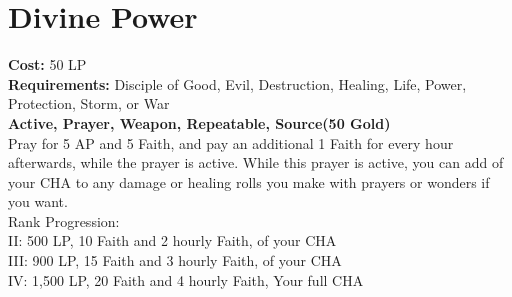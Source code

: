 \section{Divine Power}\label{prayer:divinePower}
\textbf{Cost:} 50 LP\\
\textbf{Requirements:} Disciple of Good, Evil, Destruction, Healing, Life, Power, Protection, Storm, or War\\
\textbf{Active, Prayer, Weapon, Repeatable, Source(50 Gold)}\\
Pray for 5 AP and 5 Faith, and pay an additional 1 Faith for every hour afterwards, while the prayer is active.
While this prayer is active, you can add  of your CHA to any damage or healing rolls you make with prayers or wonders if you want.
\\
Rank Progression:\\
II: 500 LP, 10 Faith and 2 hourly Faith,  of your CHA\\
III: 900 LP, 15 Faith and 3 hourly Faith,  of your CHA\\
IV: 1,500 LP, 20 Faith and 4 hourly Faith, Your full CHA\\